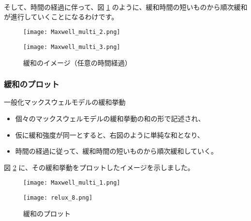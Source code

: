 \documentclass[uplatex,dvipdfmx,a4paper,11pt]{jsarticle}
\begin{document}
そして、時間の経過に伴って、図 \ref{fig:img_gen_max_1} のように、緩和時間の短いものから順次緩和が進行していくことになるわけです。

\begin{figure}[htb]
	\begin{center}
		\begin{minipage}{0.45\textwidth}
			\begin{center}
				\texttt{[image: Maxwell\_multi\_2.png]}
			\end{center}
		\end{minipage}
		\begin{minipage}{0.45\textwidth}
			\begin{center}
				\texttt{[image: Maxwell\_multi\_3.png]}
			\end{center}
		\end{minipage}
		\caption{緩和のイメージ（任意の時間経過）}
		\label{fig:img_gen_max_1}
	\end{center}
\end{figure}

\subsubsection{緩和のプロット}
	\begin{center}
		\begin{minipage}{0.9\textwidth}
			\begin{itembox}[l]{一般化マックスウェルモデルの緩和挙動}
				\begin{itemize}
					\item 個々のマックスウェルモデルの緩和挙動の和の形で記述され、
					\item 仮に緩和強度が同一とすると、右図のように単純な和となり、
					\item 時間の経過に従って、緩和時間の短いものから順次緩和していく。
				\end{itemize}
			\end{itembox}
		\end{minipage}
	\end{center}

図 \ref{fig:plot_gen_max} に、その緩和挙動をプロットしたイメージを示しました。
\begin{figure}[htb]
	\begin{center}
		\begin{minipage}{0.45\textwidth}
			\begin{center}
				\texttt{[image: Maxwell\_multi\_1.png]}
			\end{center}
		\end{minipage}
		\begin{minipage}{0.45\textwidth}
			\begin{center}
				\texttt{[image: relux\_8.png]}
			\end{center}
		\end{minipage}
		\caption{緩和のプロット}
		\label{fig:plot_gen_max}
	\end{center}
\end{figure}
\end{document}
